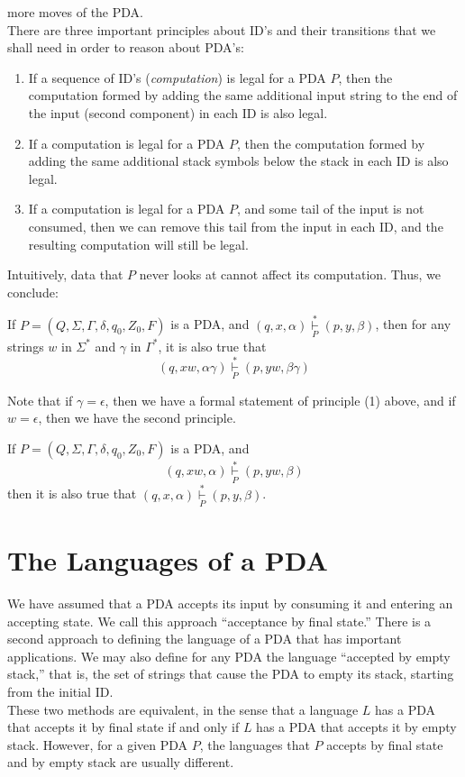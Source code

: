 \documentclass[]{article}
\begin{document}
    more moves of the PDA. \\
    \indent There are three important principles about ID's and their
    transitions that we shall need in order to reason about PDA's:
      \begin{enumerate}
        \item If a sequence of ID's (\emph{computation}) is legal for a PDA $P$,
        then the computation formed by adding the same additional input string
        to the end of the input (second component) in each ID is also legal.
        \item If a computation is legal for a PDA $P$, then the computation
        formed by adding the same additional stack symbols below the stack in
        each ID is also legal.
        \item If a computation is legal for a PDA $P$, and some tail of the
        input is not consumed, then we can remove this tail from the input in
        each ID, and the resulting computation will still be legal.
      \end{enumerate}
    Intuitively, data that $P$ never looks at cannot affect its computation.
    Thus, we conclude:
      \begin{thm}
        If $P = (Q,\Sigma,\Gamma,\delta,q_0,Z_0,F)$ is a PDA, and $(q,x,\alpha)
        \overset{*}{\underset{P}{\vdash}} (p,y,\beta)$, then for any strings $w$
        in $\Sigma^*$ and $\gamma$ in $\Gamma^*$, it is also true that
          \[
            (q,xw,\alpha\gamma)\overset{*}{\underset{P}{\vdash}}(p,yw,\beta
            \gamma)
          \]
      \end{thm}
    Note that if $\gamma = \epsilon$, then we have a formal statement of
    principle (1) above, and if $w = \epsilon$, then we have the second
    principle.
      \begin{thm}
        If $P = (Q,\Sigma,\Gamma,\delta,q_0,Z_0,F)$ is a PDA, and
          \[
            (q,xw,\alpha)\overset{*}{\underset{P}{\vdash}}(p,yw,\beta)
          \]
        then it is also true that $(q,x,\alpha)\overset{*}{\underset{P}{\vdash}}
        (p,y,\beta)$.
      \end{thm}

\section*{The Languages of a PDA}
  We have assumed that a PDA accepts its input by consuming it and entering an
  accepting state. We call this approach ``acceptance by final state.'' There is
  a second approach to defining the language of a PDA that has important
  applications. We may also define for any PDA the language ``accepted by empty
  stack,'' that is, the set of strings that cause the PDA to empty its stack,
  starting from the initial ID. \\
  \indent These two methods are equivalent, in the sense that a language $L$ has
  a PDA that accepts it by final state if and only if $L$ has a PDA that accepts
  it by empty stack. However, for a given PDA $P$, the languages that $P$
  accepts by final state and by empty stack are usually different.
\end{document}
